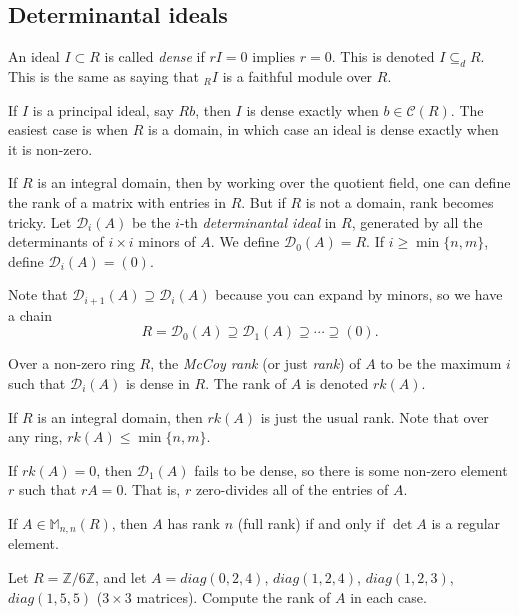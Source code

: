 \subsection{Determinantal ideals}
\begin{definition}
   An ideal $I\subset R$ is called \emph{dense} if $rI=0$ implies $r=0$.
   This is denoted $I\subseteq_d R$. This is the same as saying that ${}_RI$ is a
   faithful module over $R$.
 \end{definition}
 If $I$ is a principal ideal, say $Rb$, then $I$ is dense exactly when $b\in \mathcal{C}(R)$. The
 easiest case is when $R$ is a domain, in which case an ideal is dense exactly when it is
 non-zero.

 If $R$ is an integral domain, then by working over the quotient field, one can define
 the rank of a matrix with entries in $R$. But if $R$ is not a domain, rank becomes
 tricky. Let $\mathcal{D}_i(A)$ be the $i$-th \emph{determinantal ideal} in $R$, generated by all
 the determinants of $i\times i$ minors of $A$. We define $\mathcal{D}_0(A)=R$. If $i\ge
 \min\{n,m\}$, define $\mathcal{D}_i(A)=(0)$.

 Note that $\mathcal{D}_{i+1}(A)\supseteq \mathcal{D}_i(A)$ because you can expand by minors, so we have a
 chain
 \[
    R=\mathcal{D}_0(A)\supseteq \mathcal{D}_1(A)\supseteq \cdots \supseteq (0).
 \]
 \begin{definition}
   Over a non-zero ring $R$, the \emph{McCoy rank} (or just \emph{rank}) of $A$ to be
   the maximum $i$ such that $\mathcal{D}_i(A)$ is dense in $R$. The rank of $A$ is denoted
   $rk(A)$.
 \end{definition}
 If $R$ is an integral domain, then $rk(A)$ is just the usual rank. Note that over any
 ring, $rk(A)\le \min\{n,m\}$.

 If $rk(A)=0$, then $\mathcal{D}_1(A)$ fails to be dense, so there is some non-zero element $r$
 such that $rA=0$. That is, $r$ zero-divides all of the entries of $A$.

 If $A\in \mathbb{M}_{n,n}(R)$, then $A$ has rank $n$ (full rank) if and only if $\det A$ is a
 regular element.

 \begin{exercise}
   Let $R=\mathbb{Z}/6\mathbb{Z} $, and let $A=diag(0,2,4)$, $diag(1,2,4)$, $diag(1,2,3)$, $diag(1,5,5)$
   ($3\times 3$ matrices). Compute the rank of $A$ in each case.
 \end{exercise}
 \begin{solution}
 \end{solution}
